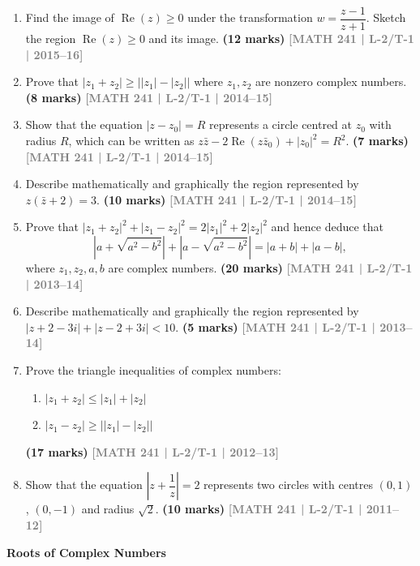 \documentclass[12pt,a3paper]{article}
\newcommand{\yr}[1]{\hfill\textcolor{gray}{\small\textbf{[#1]}}}
\newcommand{\mk}[1]{\textcolor{orange!70!black}{\small\textbf{(#1 marks)}}}
\newcommand{\subtopic}[2]{%
  \vspace{10pt}
  \noindent\begin{tcolorbox}[colback=#1!8,colframe=#1,boxrule=0.6pt,arc=4pt,
    left=6pt,right=6pt,top=4pt,bottom=4pt]
    \small\bfseries\textcolor{#1}{#2}
  \end{tcolorbox}
  \vspace{2pt}
}
\begin{document}
\begin{enumerate}
\item Find the image of $\operatorname{Re}(z)\ge 0$ under the transformation $w=\dfrac{z-1}{z+1}$. Sketch the region $\operatorname{Re}(z)\ge 0$ and its image.
\mk{12} \yr{MATH 241 | L-2/T-1 | 2015--16}


\item Prove that $|z_{1}+z_{2}| \ge \bigl||z_{1}|-|z_{2}|\bigr|$ where $z_{1},z_{2}$ are nonzero complex numbers.
\mk{8} \yr{MATH 241 | L-2/T-1 | 2014--15}


\item Show that the equation $|z-z_{0}|=R$ represents a circle centred at $z_{0}$ with radius $R$, which can be written as $z\bar{z}-2\operatorname{Re}(z\bar{z}_{0})+|z_{0}|^{2}=R^{2}$.
\mk{7} \yr{MATH 241 | L-2/T-1 | 2014--15}


\item Describe mathematically and graphically the region represented by $z(\bar{z}+2)=3$.
\mk{10} \yr{MATH 241 | L-2/T-1 | 2014--15}


\item Prove that $|z_{1}+z_{2}|^{2}+|z_{1}-z_{2}|^{2}=2|z_{1}|^{2}+2|z_{2}|^{2}$ and hence deduce that
\[
\left|a+\sqrt{a^{2}-b^{2}}\right|+\left|a-\sqrt{a^{2}-b^{2}}\right|=|a+b|+|a-b|,
\]
where $z_{1},z_{2},a,b$ are complex numbers.
\mk{20} \yr{MATH 241 | L-2/T-1 | 2013--14}


\item Describe mathematically and graphically the region represented by $|z+2-3i|+|z-2+3i|<10$.
\mk{5} \yr{MATH 241 | L-2/T-1 | 2013--14}


\item Prove the triangle inequalities of complex numbers:
\begin{enumerate}
  \item $|z_{1}+z_{2}| \le |z_{1}|+|z_{2}|$
  \item $|z_{1}-z_{2}| \ge \bigl||z_{1}|-|z_{2}|\bigr|$
\end{enumerate}
\mk{17} \yr{MATH 241 | L-2/T-1 | 2012--13}


\item Show that the equation $\left|z+\dfrac{1}{z}\right|=2$ represents two circles with centres $(0,1)$, $(0,-1)$ and radius $\sqrt{2}$.
\mk{10} \yr{MATH 241 | L-2/T-1 | 2011--12}


\end{enumerate}

\subtopic{cE}{Roots of Complex Numbers}
\label{sub:s5-roots}
\end{document}
